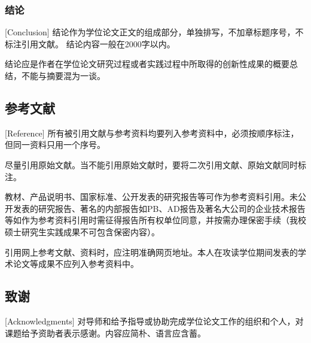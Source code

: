 \subsubsection{结论}[Conclusion]
结论作为学位论文正文的组成部分，单独排写，不加章标题序号，不标注引用文献。
结论内容一般在\num{2000}字以内。

结论应是作者在学位论文研究过程或者实践过程中所取得的创新性成果的概要总结，不能与摘要混为一谈。


\subsection{参考文献}[Reference]
所有被引用文献与参考资料均要列入参考资料中，必须按顺序标注，但同一资料只用一个序号。



尽量引用原始文献。当不能引用原始文献时，要将二次引用文献、原始文献同时标注。

教材、产品说明书、国家标准、公开发表的研究报告等可作为参考资料引用。未公开发表的研究报告、著名的内部报告如PB、AD报告及著名大公司的企业技术报告等如作为参考资料引用时需征得报告所有权单位同意，并按需办理保密手续（我校硕士研究生实践成果不可包含保密内容）。

引用网上参考文献、资料时，应注明准确网页地址。本人在攻读学位期间发表的学术论文等成果不应列入参考资料中。







\subsection{致谢}[Acknowledgments]
对导师和给予指导或协助完成学位论文工作的组织和个人，对课题给予资助者表示感谢。内容应简朴、语言应含蓄。




